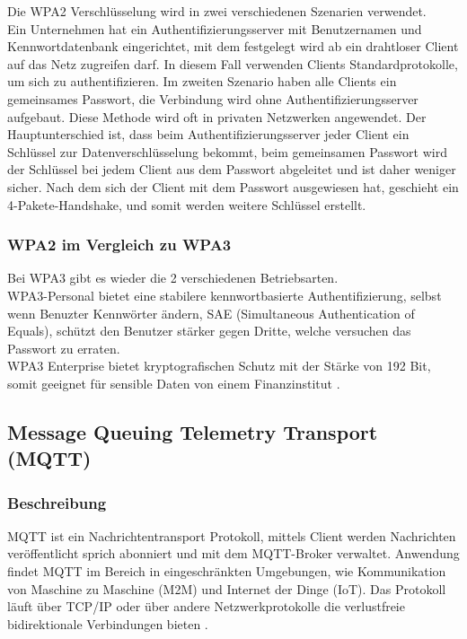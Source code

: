 Die WPA2 Verschlüsselung wird in zwei verschiedenen Szenarien verwendet.\\
Ein Unternehmen hat ein Authentifizierungsserver mit Benutzernamen und Kennwortdatenbank eingerichtet, mit dem festgelegt wird ab ein drahtloser Client auf das Netz zugreifen darf. In diesem Fall verwenden Clients Standardprotokolle, um sich zu authentifizieren.
Im zweiten Szenario haben alle Clients ein gemeinsames Passwort, die Verbindung wird ohne Authentifizierungsserver aufgebaut. Diese Methode wird oft in privaten Netzwerken angewendet. Der Hauptunterschied ist, dass beim Authentifizierungsserver jeder Client ein Schlüssel zur Datenverschlüsselung bekommt, beim gemeinsamen Passwort wird der Schlüssel bei jedem Client aus dem Passwort abgeleitet und ist daher weniger sicher.
Nach dem sich der Client mit dem Passwort ausgewiesen hat, geschieht ein 4-Pakete-Handshake, und somit werden weitere Schlüssel erstellt.  
\subsubsection{WPA2 im Vergleich zu WPA3}
Bei WPA3 gibt es wieder die 2 verschiedenen Betriebsarten.\\
WPA3-Personal bietet eine stabilere kennwortbasierte Authentifizierung, selbst wenn Benuzter Kennwörter ändern, SAE (Simultaneous Authentication of Equals), schützt den Benutzer stärker gegen Dritte, welche versuchen das Passwort zu erraten.\\
WPA3 Enterprise bietet kryptografischen Schutz mit der Stärke von 192 Bit, somit geeignet für sensible Daten von einem Finanzinstitut \cite{noauthor_wi-fi_nodate}.























\newpage
\subsection{Message Queuing Telemetry Transport (MQTT)}
\subsubsection{Beschreibung}
MQTT ist ein Nachrichtentransport Protokoll, mittels Client werden Nachrichten veröffentlicht sprich abonniert und mit dem MQTT-Broker verwaltet. Anwendung findet MQTT im Bereich in eingeschränkten Umgebungen, wie Kommunikation von Maschine zu Maschine (M2M) und Internet der Dinge (IoT). Das Protokoll läuft über TCP/IP oder über andere Netzwerkprotokolle die verlustfreie bidirektionale Verbindungen bieten \cite{noauthor_mqtt-v5.0.pdf_nodate}. 

